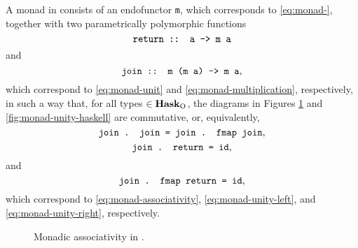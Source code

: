 A monad in \hask consists of an endofunctor \texttt{m}, which
corresponds to \eqref{eq:monad-}, together with two parametrically
polymorphic functions
\begin{equation}
  \label{eq:monad-return-haskell}
  \text{\texttt{return :: a -> m a}}
\end{equation}
and
\begin{equation}
  \label{eq:monad-join-haskell}
  \text{\texttt{join :: m (m a) -> m a}}
  \text{,}
\end{equation}
which correspond to \eqref{eq:monad-unit} and
\eqref{eq:monad-multiplication}, respectively, in such a way that, for
all types  $\in \mathcal{\mathbf{Hask}}_{\operatorname{O}}$, the diagrams in Figures
\ref{fig:monad-associativity-haskell} and
\ref{fig:monad-unity-haskell} are commutative, or, equivalently,
\begin{equation}
  \label{eq:monad-associativity-haskell}
  \text{\texttt{join . join = join . fmap join}}
  \text{,}
\end{equation}
\begin{equation}
  \label{eq:monad-unity-left-haskell}
  \text{\texttt{join . return = id}}
  \text{,}
\end{equation}
and
\begin{equation}
  \label{eq:monad-unity-right-haskell}
  \text{\texttt{join . fmap return = id}}
  \text{,}
\end{equation}
which correspond to \eqref{eq:monad-associativity},
\eqref{eq:monad-unity-left}, and \eqref{eq:monad-unity-right},
respectively.
\begin{figure}[htb]
  \begin{center}
  \end{center}
  \caption{Monadic associativity in \hask.}
  \label{fig:monad-associativity-haskell}
\end{figure}
